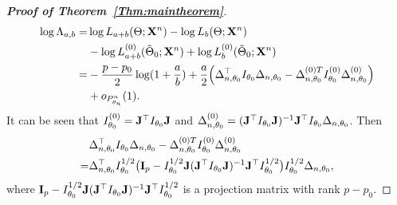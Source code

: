 \documentclass[11pt]{article}
\theoremstyle{plain}
\theoremstyle{definition}
\theoremstyle{remark}
\begin{document}
    \begin{proof}[\textbf{Proof of Theorem~\ref{Thm:maintheorem}}]
$$
\begin{aligned}
\log \Lambda_{a,b}
    =&
    \log L_{a+b}(\Theta;\mathbf{X}^{n})-
    \log L_b(\Theta;\mathbf{X}^{n})
    \\
    &-
    \log L^{(0)}_{a+b}(\tilde{\Theta}_0;\mathbf{X}^{n})+
    \log L^{(0)}_b(\tilde{\Theta}_0;\mathbf{X}^{n})\\
    =&
    -\frac{p-p_0}{2}\log (1+\frac{a}{b})
    +
    \frac{a}{2}\Big(
    \Delta_{n,\theta_0}^\top  I_{\theta_0} \Delta_{n,\theta_0}
    -
    \Delta_{n,\theta_0}^{{(0)}T} I^{(0)}_{\theta_0} \Delta^{(0)}_{n,\theta_0}
    \Big)
    \\
    &+o_{P^n_{\theta_n}}(1).
\end{aligned}
$$
It can be seen that $I_{\theta_0}^{(0)}= \mathbf{J}^\top  I_{\theta_0}\mathbf{J}$ and $\Delta_{n,\theta_0}^{(0)}=(\mathbf{J}^\top  I_{\theta_0}\mathbf{J})^{-1} \mathbf{J}^\top  I_{\theta_0} \Delta_{n,\theta_0}$.
Then
\begin{equation*}
    \begin{split}
            &\Delta_{n,\theta_0}^\top  I_{\theta_0} \Delta_{n,\theta_0}
            -
            \Delta_{n,\theta_0}^{{(0)}T} I^{(0)}_{\theta_0} \Delta^{(0)}_{n,\theta_0}
            \\
            =&
            \Delta_{n,\theta_0}^\top  I_{\theta_0}^{1/2}\big(
            \mathbf{I}_p-
            I_{\theta_0}^{1/2} \mathbf{J} (\mathbf{J}^\top  I_{\theta_0} \mathbf{J})^{-1} \mathbf{J}^\top  I_{\theta_0}^{1/2}
            \big)I_{\theta_0}^{1/2}\Delta_{n,\theta_0},
    \end{split}
\end{equation*}
where $
            \mathbf{I}_p-
            I_{\theta_0}^{1/2} \mathbf{J} (\mathbf{J}^\top  I_{\theta_0} \mathbf{J})^{-1} \mathbf{J}^\top  I_{\theta_0}^{1/2}
$
is a projection matrix with rank $p-p_0$.


\end{proof}
\end{document}
